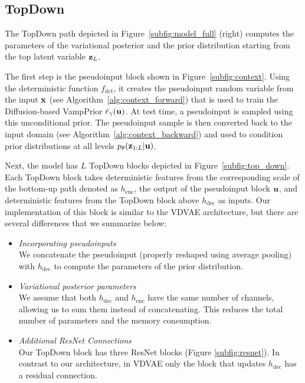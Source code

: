  \subsection{TopDown} \label{subsec:arch_decode}
The TopDown path depicted in Figure~\ref{subfig:model_full} (right) computes the parameters of the variational posterior and the prior distribution starting from the top latent variable ${\mathbf{z}}_L$. 

The first step is the pseudoinput block shown in Figure~\ref{subfig:context}. Using the deterministic function $f_{\text{dct}}$, it creates the pseudoinput random variable from the input ${\mathbf{x}}$ (see Algorithm~\ref{alg:context_forward}) that is used to train the Diffusion-based VampPrior $\hat{r}_{\gamma}({\mathbf{u}})$.
At test time, a pseudoinput is sampled using this unconditional prior. The pseudoinput sample is then converted back to the input domain (see Algorithm~\ref{alg:context_backward}) and used to condition prior distributions at all levels $p_{\theta}({\mathbf{z}}_{1:L}|{\mathbf{u}})$.

Next, the model has $L$ TopDown blocks depicted in Figure~\ref{subfig:top_down}. 
Each TopDown block takes deterministic features from the corresponding scale of the bottom-up path denoted as $h_{\text{enc}}$, the output of the pseudoinput block ${\mathbf{u}}$, and deterministic features from the TopDown block above $h_{\text{dec}}$ as inputs. Our implementation of this block is similar to the VDVAE architecture, but there are several differences that we summarize below:
\begin{itemize}%
    \item \textit{Incorporating pseudoinputs}\\
    We concatenate the pseudoinput (properly reshaped using average pooling) with $h_{\text{dec}}$ to compute the parameters of the prior distribution. 
    \item \textit{Variational posterior parameters} \\
    We assume that both $h_{\text{dec}}$ and $h_{\text{enc}}$ have the same number of channels, allowing us to sum them instead of concatenating. This reduces the total number of parameters and the memory consumption.
    \item \textit{Additional ResNet Connections}\\
    Our TopDown block has three ResNet blocks (Figure \ref{subfig:resnet}). In contrast to our architecture, in VDVAE only the block that updates $h_{\text{dec}}$ has a residual connection. 
\end{itemize}

